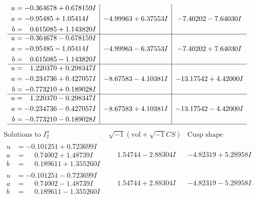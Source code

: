 \documentclass[1p]{elsarticle_modified}
\theoremstyle{definition}
\newcommand{\I}{\sqrt{-1}}
\begin{document}
$$\begin{array}{c|c|c}
\begin{aligned}
u &= -0.364678 + 0.678159 I \\
a &= -0.95485 + 1.05414 I \\
b &= \phantom{-}0.615085 + 1.143820 I\end{aligned}
 & -4.99963 + 6.37553 I & -7.40202 - 7.64030 I \\ \hline\begin{aligned}
u &= -0.364678 - 0.678159 I \\
a &= -0.95485 - 1.05414 I \\
b &= \phantom{-}0.615085 - 1.143820 I\end{aligned}
 & -4.99963 - 6.37553 I & -7.40202 + 7.64030 I \\ \hline\begin{aligned}
u &= \phantom{-}1.220370 + 0.298347 I \\
a &= -0.234736 + 0.427057 I \\
b &= -0.773210 + 0.189028 I\end{aligned}
 & -8.67583 - 4.10381 I & -13.17542 + 4.42000 I \\ \hline\begin{aligned}
u &= \phantom{-}1.220370 - 0.298347 I \\
a &= -0.234736 - 0.427057 I \\
b &= -0.773210 - 0.189028 I\end{aligned}
 & -8.67583 + 4.10381 I & -13.17542 - 4.42000 I\\
 \hline 
 \end{array}$$\newpage$$\begin{array}{c|c|c}  
\text{Solutions to }I^u_{2}& \I (\text{vol} + \sqrt{-1}CS) & \text{Cusp shape}\\
 \hline 
\begin{aligned}
u &= -0.101251 + 0.723699 I \\
a &= \phantom{-}0.74002 + 1.48739 I \\
b &= \phantom{-}0.189611 + 1.355260 I\end{aligned}
 & \phantom{-}1.54744 - 2.88304 I & -4.82319 + 5.28958 I \\ \hline\begin{aligned}
u &= -0.101251 - 0.723699 I \\
a &= \phantom{-}0.74002 - 1.48739 I \\
b &= \phantom{-}0.189611 - 1.355260 I\end{aligned}
 & \phantom{-}1.54744 + 2.88304 I & -4.82319 - 5.28958 I \\ \hline\begin{aligned}

\end{aligned}
\end{array}$$
\end{document}
